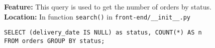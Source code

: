 \textbf{Feature:} This query is used to get the number of orders by status. \\
\textbf{Location:} In function \texttt{search()} in \texttt{front-end/\_\_init\_\_.py}

\begin{lstlisting}
SELECT (delivery_date IS NULL) as status, COUNT(*) AS n
FROM orders GROUP BY status;
\end{lstlisting}